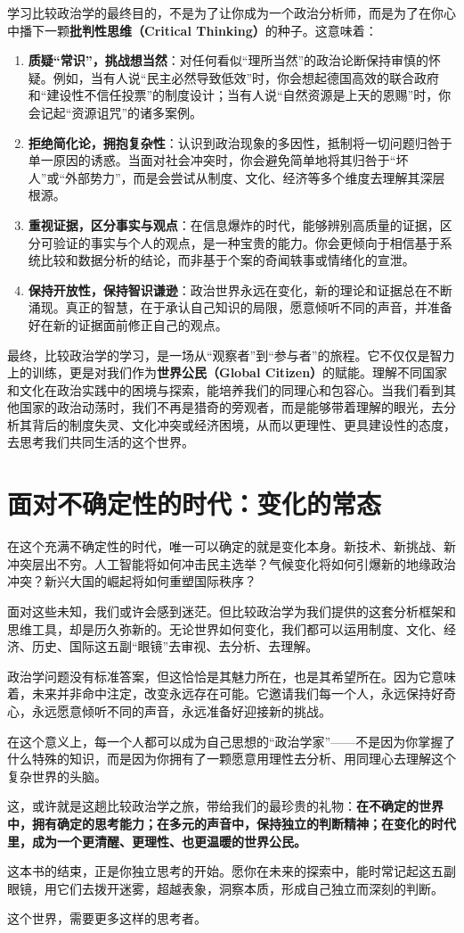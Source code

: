 学习比较政治学的最终目的，不是为了让你成为一个政治分析师，而是为了在你心中播下一颗\textbf{批判性思维（Critical Thinking）}的种子。这意味着：
\begin{enumerate}
    \item \textbf{质疑“常识”，挑战想当然}：对任何看似“理所当然”的政治论断保持审慎的怀疑。例如，当有人说“民主必然导致低效”时，你会想起德国高效的联合政府和“建设性不信任投票”的制度设计；当有人说“自然资源是上天的恩赐”时，你会记起“资源诅咒”的诸多案例。
    \item \textbf{拒绝简化论，拥抱复杂性}：认识到政治现象的多因性，抵制将一切问题归咎于单一原因的诱惑。当面对社会冲突时，你会避免简单地将其归咎于“坏人”或“外部势力”，而是会尝试从制度、文化、经济等多个维度去理解其深层根源。
    \item \textbf{重视证据，区分事实与观点}：在信息爆炸的时代，能够辨别高质量的证据，区分可验证的事实与个人的观点，是一种宝贵的能力。你会更倾向于相信基于系统比较和数据分析的结论，而非基于个案的奇闻轶事或情绪化的宣泄。
    \item \textbf{保持开放性，保持智识谦逊}：政治世界永远在变化，新的理论和证据总在不断涌现。真正的智慧，在于承认自己知识的局限，愿意倾听不同的声音，并准备好在新的证据面前修正自己的观点。
\end{enumerate}
最终，比较政治学的学习，是一场从“观察者”到“参与者”的旅程。它不仅仅是智力上的训练，更是对我们作为\textbf{世界公民（Global Citizen）}的赋能。理解不同国家和文化在政治实践中的困境与探索，能培养我们的同理心和包容心。当我们看到其他国家的政治动荡时，我们不再是猎奇的旁观者，而是能够带着理解的眼光，去分析其背后的制度失灵、文化冲突或经济困境，从而以更理性、更具建设性的态度，去思考我们共同生活的这个世界。

\section{面对不确定性的时代：变化的常态}
在这个充满不确定性的时代，唯一可以确定的就是变化本身。新技术、新挑战、新冲突层出不穷。人工智能将如何冲击民主选举？气候变化将如何引爆新的地缘政治冲突？新兴大国的崛起将如何重塑国际秩序？

面对这些未知，我们或许会感到迷茫。但比较政治学为我们提供的这套分析框架和思维工具，却是历久弥新的。无论世界如何变化，我们都可以运用制度、文化、经济、历史、国际这五副“眼镜”去审视、去分析、去理解。

政治学问题没有标准答案，但这恰恰是其魅力所在，也是其希望所在。因为它意味着，未来并非命中注定，改变永远存在可能。它邀请我们每一个人，永远保持好奇心，永远愿意倾听不同的声音，永远准备好迎接新的挑战。

在这个意义上，每一个人都可以成为自己思想的“政治学家”——不是因为你掌握了什么特殊的知识，而是因为你拥有了一颗愿意用理性去分析、用同理心去理解这个复杂世界的头脑。

这，或许就是这趟比较政治学之旅，带给我们的最珍贵的礼物：\textbf{在不确定的世界中，拥有确定的思考能力；在多元的声音中，保持独立的判断精神；在变化的时代里，成为一个更清醒、更理性、也更温暖的世界公民。}

这本书的结束，正是你独立思考的开始。愿你在未来的探索中，能时常记起这五副眼镜，用它们去拨开迷雾，超越表象，洞察本质，形成自己独立而深刻的判断。

这个世界，需要更多这样的思考者。